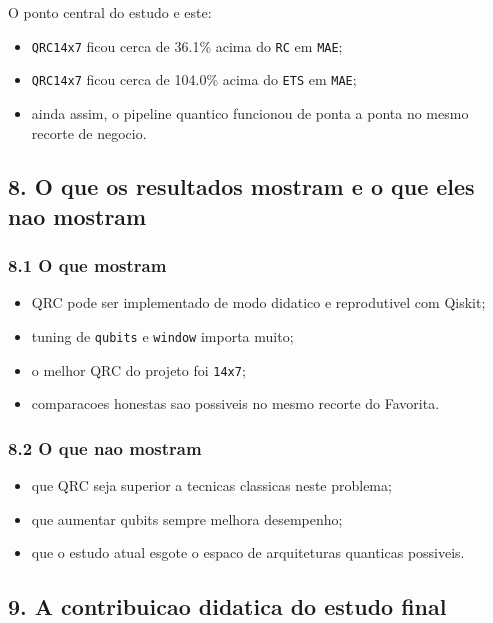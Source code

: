 \documentclass[12pt]{article}
\providecommand{\tightlist}{%
          \setlength{\itemsep}{0pt}\setlength{\parskip}{0pt}}
\begin{document}
O ponto central do estudo e este:

\begin{itemize}
\tightlist
\item
  \texttt{QRC14x7} ficou cerca de 36.1\% acima do \texttt{RC} em \texttt{MAE};
\item
  \texttt{QRC14x7} ficou cerca de 104.0\% acima do \texttt{ETS} em \texttt{MAE};
\item
  ainda assim, o pipeline quantico funcionou de ponta a ponta no mesmo recorte de negocio.
\end{itemize}

\subsection{8. O que os resultados mostram e o que eles nao mostram}\label{8-o-que-os-resultados-mostram-e-o-que-eles-nao-mostram}

\subsubsection{8.1 O que mostram}\label{81-o-que-mostram}

\begin{itemize}
\tightlist
\item
  QRC pode ser implementado de modo didatico e reprodutivel com Qiskit;
\item
  tuning de \texttt{qubits} e \texttt{window} importa muito;
\item
  o melhor QRC do projeto foi \texttt{14x7};
\item
  comparacoes honestas sao possiveis no mesmo recorte do Favorita.
\end{itemize}

\subsubsection{8.2 O que nao mostram}\label{82-o-que-nao-mostram}

\begin{itemize}
\tightlist
\item
  que QRC seja superior a tecnicas classicas neste problema;
\item
  que aumentar qubits sempre melhora desempenho;
\item
  que o estudo atual esgote o espaco de arquiteturas quanticas possiveis.
\end{itemize}

\subsection{9. A contribuicao didatica do estudo final}\label{9-a-contribuicao-didatica-do-estudo-final}
\end{document}
